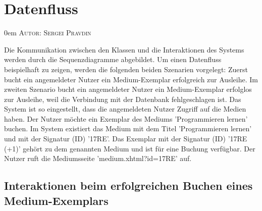 \documentclass{article}
\makeatletter
\newcommand{\sectionauthor}[1]{
	{\parindent 0em \large \scshape Autor: #1 \par \nobreak \vspace*{1em}}
	\@afterheading
}
\makeatother
\begin{document}






\newpage
\section{Datenfluss}
\sectionauthor{Sergei Pravdin}
Die Kommunikation zwischen den Klassen und die Interaktionen des Systems werden durch die Sequenzdiagramme abgebildet. Um einen Datenfluss beispielhaft zu zeigen, werden die folgenden beiden Szenarien vorgelegt: Zuerst bucht ein angemeldeter Nutzer ein Medium-Exemplar erfolgreich zur Ausleihe. Im zweiten Szenario bucht ein angemeldeter Nutzer ein Medium-Exemplar erfolglos zur Ausleihe, weil die Verbindung mit der Datenbank fehlgeschlagen ist. Das System ist so eingestellt, dass die angemeldeten Nutzer Zugriff auf die Medien haben. Der Nutzer möchte ein Exemplar des Mediums 'Programmieren lernen' buchen. Im System existiert das Medium mit dem Titel 'Programmieren lernen' und mit der Signatur (ID) '17RE'. Das Exemplar mit der Signatur (ID) '17RE (+1)' gehört zu dem genannten Medium und ist für eine Buchung verfügbar. Der Nutzer ruft die Mediumsseite 'medium.xhtml?id=17RE' auf.
\subsection{Interaktionen beim erfolgreichen Buchen eines Medium-Exemplars}
\end{document}
